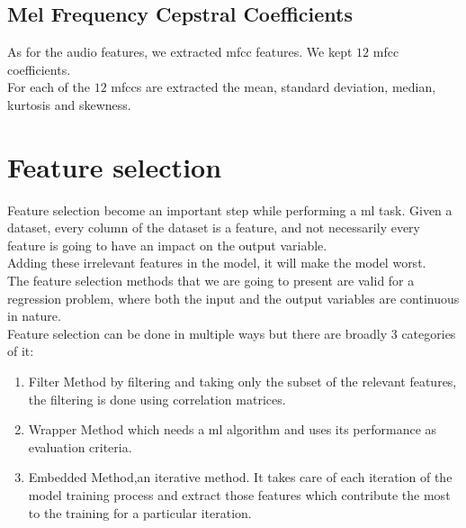 \subsection{Mel Frequency Cepstral Coefficients}
As for the audio features, we extracted \gls{mfcc} features. We kept $12$ \gls{mfcc} coefficients.
\\
For each of the $12$ \gls{mfcc}s are extracted the mean, standard deviation, median, kurtosis and skewness.

\newpage
\section{Feature selection}\label{feature_selection_5}
Feature selection become an important step while performing a \gls{ml} task. Given a dataset, every column of the dataset is a feature, and not necessarily every feature is going to have an impact on the output variable.
\\
Adding these irrelevant features in the model, it will make the model worst.
\\
The feature selection methods that we are going to present are valid for a regression problem, where both the input and the output variables are continuous in nature.
\\ \indent
Feature selection can be done in multiple ways but there are broadly 3 categories of it:
\begin{enumerate}
	\item Filter Method by filtering and taking only the subset of the relevant features, the filtering is done using correlation matrices. 
	\item Wrapper Method which needs a \gls{ml} algorithm and uses its performance as evaluation criteria.
	\item Embedded Method,an iterative method. It takes care of each iteration of the model training process and extract those features which contribute the most to the training for a particular iteration.
\end{enumerate}

